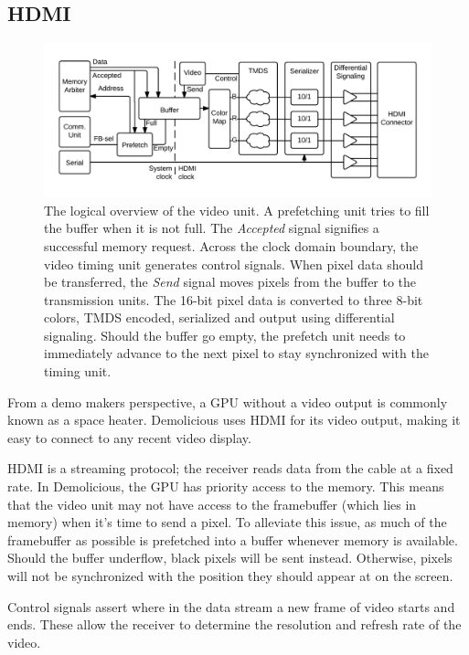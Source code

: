 \documentclass[../main/report.tex]{subfiles}
\begin{document}
\subsection{HDMI}
\begin{figure}
	\centering
	\includegraphics[width=\textwidth]{../gpu/diagrams/HDMI_overview.png}
	\caption{
		The logical overview of the video unit.
		A prefetching unit tries to fill the buffer when it is not full.
		The \emph{Accepted} signal signifies a successful memory request.
		Across the clock domain boundary, the video timing unit generates control signals.
		When pixel data should be transferred, the \emph{Send} signal moves pixels from the buffer to the transmission units.
		The 16-bit pixel data is converted to three 8-bit colors, TMDS encoded, serialized and output using differential signaling.
		Should the buffer go empty, the prefetch unit needs to immediately advance to the next pixel to stay synchronized with the timing unit.
	}
	\label{fig:video_unit}
\end{figure}

From a demo makers perspective, a GPU without a video output is commonly known as a space heater.
Demolicious uses HDMI for its video output, making it easy to connect to any recent video display.

HDMI is a streaming protocol; the receiver reads data from the cable at a fixed rate.
In Demolicious, the GPU has priority access to the memory.
This means that the video unit may not have access to the framebuffer (which lies in memory) when it's time to send a pixel.
To alleviate this issue, as much of the framebuffer as possible is prefetched into a buffer whenever memory is available.
Should the buffer underflow, black pixels will be sent instead.
Otherwise, pixels will not be synchronized with the position they should appear at on the screen.

Control signals assert where in the data stream a new frame of video starts and ends.
These allow the receiver to determine the resolution and refresh rate of the video.
\end{document}
